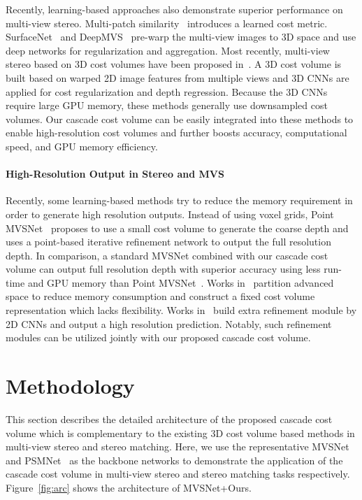 \documentclass[10pt,twocolumn,letterpaper]{article}
\begin{document}
Recently, learning-based approaches also demonstrate superior performance on multi-view stereo. Multi-patch similarity~\cite{hartmann2017learned} introduces a learned cost metric. SurfaceNet~\cite{ji2017surfacenet_mvsnet14} and DeepMVS~\cite{huang2018deepmvs} pre-warp the multi-view images to 3D space and use deep networks for regularization and aggregation. Most recently, multi-view stereo based on 3D cost volumes have been proposed in~\cite{yao2018mvsnet, im2019dpsnet, Luo_2019_ICCV, yao2019recurrent, chen2019point, hou2019multi, xue2019mvscrf}. A 3D cost volume is built based on warped 2D image features from multiple views and 3D CNNs are applied for cost regularization and depth regression.
Because the 3D CNNs require large GPU memory, these methods generally use downsampled cost volumes. 
Our cascade cost volume can be easily integrated into these methods to enable high-resolution cost volumes and further boosts accuracy, computational speed, and GPU memory efficiency.

\paragraph{High-Resolution Output in Stereo and MVS}\vspace{-4mm}
Recently, some learning-based methods try to reduce the memory requirement in order to generate high resolution outputs.
Instead of using voxel grids, Point MVSNet~\cite{chen2019point} proposes to use a small cost volume to generate the coarse depth and uses a point-based iterative refinement network to output the full resolution depth.
In comparison, a standard MVSNet combined with our cascade cost volume can output full resolution depth with superior accuracy using less run-time and GPU memory than Point MVSNet~\cite{chen2019point}.
Works in~\cite{wang2017ocnn, riegler2017octnet} partition advanced space to reduce memory consumption and construct a fixed cost volume representation which lacks flexibility.
Works in~\cite{yang2018segstereo, song2018edgestereo, Luo_2019_ICCV} build extra refinement module by 2D CNNs and output a high resolution prediction. 
Notably, such refinement modules can be utilized jointly with our proposed cascade cost volume. 


 
\section{Methodology} 
This section describes the detailed architecture of the proposed cascade cost volume which is complementary to the existing 3D cost volume based methods in multi-view stereo and stereo matching.
Here, we use the representative MVSNet~\cite{yao2018mvsnet} and PSMNet~\cite{chang2018pyramid} as the backbone networks to demonstrate the application of the cascade cost volume in multi-view stereo and stereo matching tasks respectively.
Figure~\ref{fig:arc} shows the architecture of MVSNet+Ours.
\end{document}
